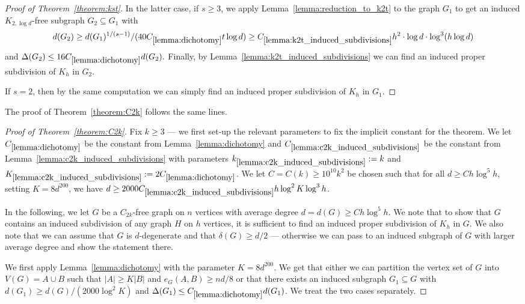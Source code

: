 \documentclass[10pt, a4paper]{article}
\numberwithin{theorem}{section} %
\theoremstyle{remark}
\theoremstyle{definition}
\begin{document}
\begin{proof}[Proof of Theorem~\ref{theorem:kst}]
    In the latter case, if $s \geq 3$, we apply Lemma~\ref{lemma:reduction_to_k2t} to the graph $G_1$ to get an induced $K_{2, \log d}$-free subgraph $G_2 \subseteq G_1$ with 
    \[
        d(G_2) \geq d(G_1)^{1/(s-1)}/(40C_{\ref{lemma:dichotomy}}t \log d)\geq C_{\ref{lemma:k2t_induced_subdivisions}} h^2\cdot \log d \cdot \log^3 (h \log d)
    \]
    and $\Delta(G_2) \leq 16C_{\ref{lemma:dichotomy}} d(G_2).$
    Finally, by Lemma~\ref{lemma:k2t_induced_subdivisions} we can find an induced proper subdivision of $K_h$ in $G_2$.

    If $s = 2$, then by the same computation we can simply find an induced proper subdivision of $K_h$ in $G_1$.
\end{proof}

The proof of Theorem~\ref{theorem:C2k} follows the same lines.
\begin{proof}[Proof of Theorem~\ref{theorem:C2k}]
    Fix $k \geq 3$ --- we first set-up the relevant parameters to fix the implicit constant for the theorem.
    We let $C_{\ref{lemma:dichotomy}}$ be the constant from Lemma~\ref{lemma:dichotomy} and $C_{\ref{lemma:c2k_induced_subdivisions}}$ be the constant from Lemma~\ref{lemma:c2k_induced_subdivisions} with parameters $k_{\ref{lemma:c2k_induced_subdivisions}} := k$ and $K_{\ref{lemma:c2k_induced_subdivisions}} := 2C_{\ref{lemma:dichotomy}}$.
    We let $C = C(k) \geq 10^{10}k^2$ be chosen such that for all $d \geq Ch\log^5h$, setting $K = 8d^{200}$, we have $d \geq 2000C_{\ref{lemma:c2k_induced_subdivisions}}  h\log^2K \log^3h$. 

    In the following, we let $G$ be a $C_{2k}$-free graph on $n$ vertices with average degree $d = d(G) \geq Ch\log^5h$. 
    We note that to show that $G$ contains an induced subdivision of any graph $H$ on $h$ vertices, it is sufficient to find an induced proper subdivision of $K_h$ in $G$.
    We also note that we can assume that $G$ is $d$-degenerate and that $\delta(G) \geq d/2$ --- otherwise we can pass to an induced subgraph of $G$ with larger average degree and show the statement there.

    We first apply Lemma~\ref{lemma:dichotomy} with the parameter $K = 8d^{200}$.
    We get that either we can partition the vertex set of $G$ into $V(G) = A \cup B$ such that $|A| \geq K|B|$ and $e_G(A, B) \geq nd/8$ or that there exists an induced subgraph $G_1 \subseteq G$ with $d(G_1) \geq d(G)/(2000\log^2K)$ and $\Delta(G_1) \leq C_{\ref{lemma:dichotomy}} d(G_1)$.
    We treat the two cases separately.


\end{proof}
\end{document}
